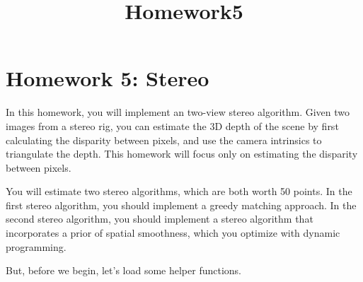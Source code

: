 \documentclass[11pt]{article}
\title{Homework5}
\begin{document}
    
    
    \maketitle
    
    

    
    \section{Homework 5: Stereo}\label{homework-5-stereo}

In this homework, you will implement an two-view stereo algorithm. Given
two images from a stereo rig, you can estimate the 3D depth of the scene
by first calculating the disparity between pixels, and use the camera
intrinsics to triangulate the depth. This homework will focus only on
estimating the disparity between pixels.

You will estimate two stereo algorithms, which are both worth 50 points.
In the first stereo algorithm, you should implement a greedy matching
approach. In the second stereo algorithm, you should implement a stereo
algorithm that incorporates a prior of spatial smoothness, which you
optimize with dynamic programming.

But, before we begin, let's load some helper functions.
\end{document}

